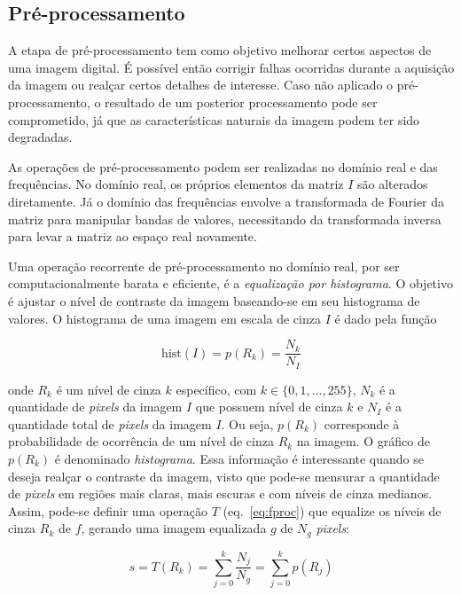 \subsection{Pré-processamento}
\label{sec:preproc}

A etapa de pré-processamento tem como objetivo melhorar certos
aspectos de uma imagem digital. É possível então corrigir falhas
ocorridas durante a aquisição da imagem ou realçar certos detalhes de
interesse. Caso não aplicado o pré-processamento, o resultado de um
posterior processamento pode ser comprometido, já que as
características naturais da imagem podem ter sido
degradadas.~\cite{luciano,gonzalez}

As operações de pré-processamento podem ser realizadas no domínio real
e das frequências. No domínio real, os próprios elementos da matriz
$I$ são alterados diretamente. Já o domínio das frequências envolve a
transformada de Fourier da matriz para manipular bandas de valores,
necessitando da transformada inversa para levar a matriz ao espaço
real novamente.

Uma operação recorrente de pré-processamento no domínio real, por ser
computacionalmente barata e eficiente, é a \emph{equalização por
  histograma}. O objetivo é ajustar o nível de contraste da imagem
baseando-se em seu histograma de valores. O histograma de uma imagem em escala de cinza
$I$ é dado pela função

\begin{equation}
\text{hist}(I) = p(R_k) = \frac{N_k}{N_I}
\end{equation}

\noindent onde $R_k$ é um nível de cinza $k$ específico, com $k \in \{0, 1, ...,
255\}$, $N_k$ é a quantidade de
\textit{pixels} da imagem $I$ que possuem nível de cinza $k$ e $N_I$ é a quantidade total de \textit{pixels} da imagem $I$. Ou seja,
$p(R_k)$ corresponde à probabilidade de ocorrência de um nível de
cinza $R_k$ na imagem. O gráfico de $p(R_k)$ é denominado
\emph{histograma}. Essa informação é interessante quando se deseja
realçar o contraste da imagem, visto que pode-se mensurar a quantidade
de \textit{pixels} em regiões mais claras, mais escuras e com níveis de cinza
medianos. Assim, pode-se definir uma operação $T$ (eq.~\ref{eq:fproc}) que equalize os
níveis de cinza $R_k$ de $f$, gerando uma imagem equalizada $g$ de $N_g$ \textit{pixels}:

\begin{equation}
s = T(R_k) = \sum_{j=0}^k \frac{N_j}{N_g} = \sum_{j=0}^k p(R_j)
\end{equation}

